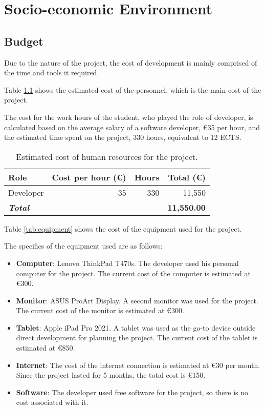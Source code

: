 \chapter{Socio-economic Environment}\label{chap:planning}

\section{Budget}\label{sec:budget}

Due to the nature of the project, the cost of development is mainly comprised of the time and tools it required. 

Table \ref{tab:human-resources} shows the estimated cost of the personnel, which is the main cost of the project.

The cost for the work hours of the student, who played the role of developer, is calculated based on the average salary of a software developer, €35 per hour, and the estimated time spent on the project, 330 hours, equivalent to 12 ECTS.

\begin{table}[H]
    \begin{tabular}{l r r r}
        \hline
        \textbf{Role} & \textbf{Cost per hour (€)} & \textbf{Hours} & \textbf{Total (€)} \\
        \hline
        Developer & 35 & 330 & 11,550 \\
        \hline
        \textbf{\textit{Total}} & & & \textbf{11,550.00} \\
        \hline
    \end{tabular}
    \caption{Estimated cost of human resources for the project.}
    \label{tab:human-resources}
\end{table}

Table \ref{tab:equipment} shows the cost of the equipment used for the project.

The specifics of the equipment used are as follows:

\begin{itemize}
    \item \textbf{Computer}: Lenovo ThinkPad T470s. The developer used his personal computer for the project. The current cost of the computer is estimated at €300.
    \item \textbf{Monitor}: ASUS ProArt Display. A second monitor was used for the project. The current cost of the monitor is estimated at €300.
    \item \textbf{Tablet}: Apple iPad Pro 2021. A tablet was used as the go-to device outside direct development for planning the project. The current cost of the tablet is estimated at €850.
    \item \textbf{Internet}: The cost of the internet connection is estimated at €30 per month. Since the project lasted for 5 months, the total cost is €150.
    \item \textbf{Software}: The developer used free software for the project, so there is no cost associated with it.
\end{itemize}

